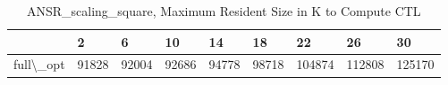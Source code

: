 \begin{table}
\centering
\caption{ANSR\_scaling\_square, Maximum Resident Size in K to Compute CTL}
\label{ANSR_scaling_square_CTL_size}
\begin{tabular}{lllllllll}
\toprule
{} &      2 &      6 &     10 &     14 &     18 &      22 &      26 &      30 \\
\midrule
full\textbackslash \_opt &  91828 &  92004 &  92686 &  94778 &  98718 &  104874 &  112808 &  125170 \\
\bottomrule
\end{tabular}
\end{table}
